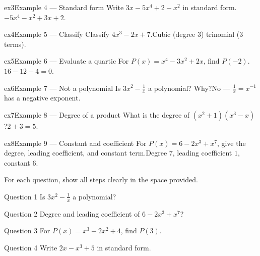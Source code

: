 \documentclass[11pt]{article}
\begin{document}
\begin{example}{ex3}{Example 4 --- Standard form}
Write $3x-5x^4+2-x^2$ in standard form.\soln $-5x^4-x^2+3x+2$.
\end{example}

\begin{example}{ex4}{Example 5 --- Classify}
Classify $4x^3-2x+7$.\soln Cubic (degree 3) trinomial (3 terms).
\end{example}

\begin{example}{ex5}{Example 6 --- Evaluate a quartic}
For $P(x)=x^4-3x^2+2x$, find $P(-2)$.\soln $16-12-4=0$.
\end{example}

\begin{example}{ex6}{Example 7 --- Not a polynomial}
Is $3x^2-\tfrac1x$ a polynomial? Why?\soln No — $\tfrac1x=x^{-1}$ has a negative exponent.
\end{example}

\begin{example}{ex7}{Example 8 --- Degree of a product}
What is the degree of $(x^2+1)(x^3-x)$?\soln $2+3=5$.
\end{example}

\begin{example}{ex8}{Example 9 --- Constant and coefficient}
For $P(x)=6-2x^3+x^7$, give the degree, leading coefficient, and constant term.\soln Degree $7$, leading coefficient $1$, constant $6$.
\end{example}

\clearpage
{}
For each question, show all steps clearly in the space provided.

\begin{qbox}{Question 1}
Is $3x^2-\tfrac{1}{x}$ a polynomial?\workspace{2.4cm}
\end{qbox}

\begin{qbox}{Question 2}
Degree and leading coefficient of $6-2x^3+x^7$?\workspace{2.4cm}
\end{qbox}

\begin{qbox}{Question 3}
For $P(x)=x^3-2x^2+4$, find $P(3)$.\workspace{2.4cm}
\end{qbox}

\begin{qbox}{Question 4}
Write $2x-x^3+5$ in standard form.\workspace{2.4cm}
\end{qbox}
\end{document}
